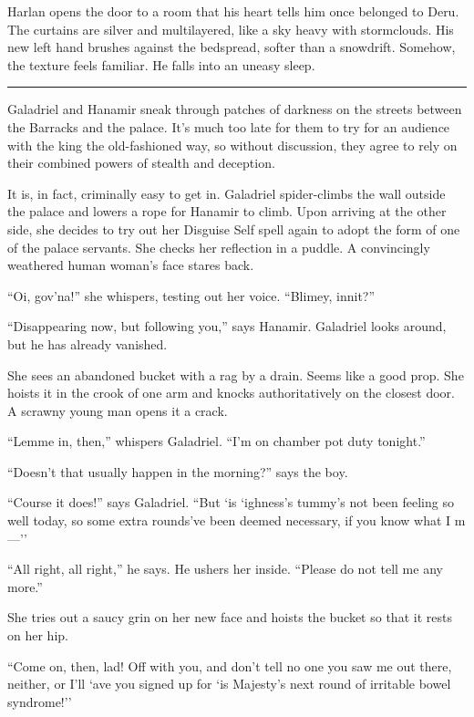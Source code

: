 \documentclass[smalldemyvopaper,11pt,twoside,onecolumn,openright,extrafontsizes]{memoir}
\begin{document}
Harlan opens the door to a room that his heart tells him once belonged
to Deru. The curtains are silver and multilayered, like a sky heavy with
stormclouds. His new left hand brushes against the bedspread, softer
than a snowdrift. Somehow, the texture feels familiar. He falls into an
uneasy sleep.

\begin{center}\rule{0.5\linewidth}{\linethickness}\end{center}

Galadriel and Hanamir sneak through patches of darkness on the streets
between the Barracks and the palace. It's much too late for them to try
for an audience with the king the old-fashioned way, so without
discussion, they agree to rely on their combined powers of stealth and
deception.

It is, in fact, criminally easy to get in. Galadriel spider-climbs the
wall outside the palace and lowers a rope for Hanamir to climb. Upon
arriving at the other side, she decides to try out her Disguise Self
spell again to adopt the form of one of the palace servants. She checks
her reflection in a puddle. A convincingly weathered human woman's face
stares back.

``Oi, gov'na!'' she whispers, testing out her voice. ``Blimey, innit?''

``Disappearing now, but following you,'' says Hanamir. Galadriel looks
around, but he has already vanished.

She sees an abandoned bucket with a rag by a drain. Seems like a good
prop. She hoists it in the crook of one arm and knocks authoritatively
on the closest door. A scrawny young man opens it a crack.

``Lemme in, then,'' whispers Galadriel. ``I'm on chamber pot duty
tonight.''

``Doesn't that usually happen in the morning?'' says the boy.

``Course it does!'' says Galadriel. ``But `is `ighness's tummy's not
been feeling so well today, so some extra rounds've been deemed
necessary, if you know what I m---''

``All right, all right,'' he says. He ushers her inside. ``Please do not
tell me any more.''

She tries out a saucy grin on her new face and hoists the bucket so that
it rests on her hip.

``Come on, then, lad! Off with you, and don't tell no one you saw me out
there, neither, or I'll `ave you signed up for `is Majesty's next round
of irritable bowel syndrome!''
\end{document}
